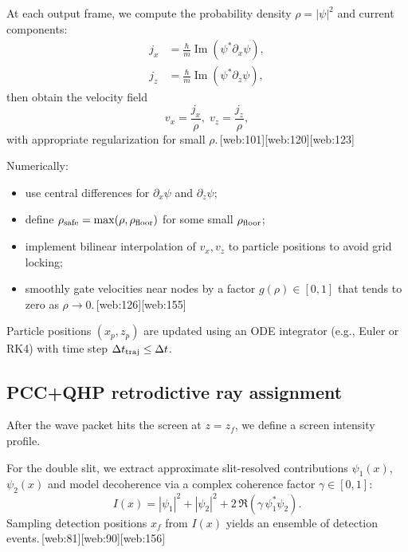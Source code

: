 \documentclass[11pt]{article}
\begin{document}
At each output frame, we compute the probability density \(\rho = |\psi|^2\) and current components:
\begin{align}
j_x &= \frac{\hbar}{m}\operatorname{Im}\left(\psi^*\partial_x\psi\right),\\
j_z &= \frac{\hbar}{m}\operatorname{Im}\left(\psi^*\partial_z\psi\right),
\end{align}
then obtain the velocity field
\begin{equation}
v_x = \frac{j_x}{\rho},\; v_z = \frac{j_z}{\rho},
\end{equation}
with appropriate regularization for small \(\rho\).\,[web:101][web:120][web:123]

Numerically:

\begin{itemize}[leftmargin=*]
  \item use central differences for \(\partial_x\psi\) and \(\partial_z\psi\);
  \item define \(\rho_{\rm safe} = \max(\rho,\rho_{\rm floor})\) for some small \(\rho_{\rm floor}\);
  \item implement bilinear interpolation of \(v_x,v_z\) to particle positions to avoid grid locking;
  \item smoothly gate velocities near nodes by a factor \(g(\rho)\in[0,1]\) that tends to zero as \(\rho\to 0\).\,[web:126][web:155]
\end{itemize}

Particle positions \((x_p,z_p)\) are updated using an ODE integrator (e.g., Euler or RK4) with time step \(\Delta t_{\rm traj}\le \Delta t\).

\subsection{PCC+QHP retrodictive ray assignment}

After the wave packet hits the screen at \(z=z_f\), we define a screen intensity profile.

For the double slit, we extract approximate slit-resolved contributions \(\psi_1(x)\), \(\psi_2(x)\) and model decoherence via a complex coherence factor \(\gamma\in[0,1]\):
\begin{equation}
I(x) = |\psi_1|^2 + |\psi_2|^2 + 2\,\Re\left(\gamma\,\psi_1^*\psi_2\right).\label{eq:coherence-intensity}
\end{equation}
Sampling detection positions \(x_f\) from \(I(x)\) yields an ensemble of detection events.\,[web:81][web:90][web:156]
\end{document}
